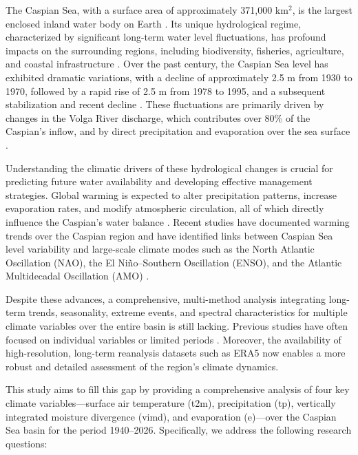 \documentclass[12pt,a4paper]{article}
\begin{document}
The Caspian Sea, with a surface area of approximately 371,000 km$^2$, is the largest enclosed inland water body on Earth \citep{kostianoy2014}. Its unique hydrological regime, characterized by significant long-term water level fluctuations, has profound impacts on the surrounding regions, including biodiversity, fisheries, agriculture, and coastal infrastructure \citep{terziev1992,golubov1998}. Over the past century, the Caspian Sea level has exhibited dramatic variations, with a decline of approximately 2.5 m from 1930 to 1970, followed by a rapid rise of 2.5 m from 1978 to 1995, and a subsequent stabilization and recent decline \citep{arpad2006}. These fluctuations are primarily driven by changes in the Volga River discharge, which contributes over 80\% of the Caspian's inflow, and by direct precipitation and evaporation over the sea surface \citep{kislov2018}.

Understanding the climatic drivers of these hydrological changes is crucial for predicting future water availability and developing effective management strategies. Global warming is expected to alter precipitation patterns, increase evaporation rates, and modify atmospheric circulation, all of which directly influence the Caspian's water balance \citep{ipcc2021}. Recent studies have documented warming trends over the Caspian region \citep{shevchenko2017} and have identified links between Caspian Sea level variability and large-scale climate modes such as the North Atlantic Oscillation (NAO), the El Niño–Southern Oscillation (ENSO), and the Atlantic Multidecadal Oscillation (AMO) \citep{arpad2006,kislov2018}.

Despite these advances, a comprehensive, multi-method analysis integrating long-term trends, seasonality, extreme events, and spectral characteristics for multiple climate variables over the entire basin is still lacking. Previous studies have often focused on individual variables or limited periods \citep{safarov2019,panin2007}. Moreover, the availability of high-resolution, long-term reanalysis datasets such as ERA5 \citep{hersbach2020} now enables a more robust and detailed assessment of the region's climate dynamics.

This study aims to fill this gap by providing a comprehensive analysis of four key climate variables—surface air temperature (t2m), precipitation (tp), vertically integrated moisture divergence (vimd), and evaporation (e)—over the Caspian Sea basin for the period 1940–2026. Specifically, we address the following research questions:
\end{document}
